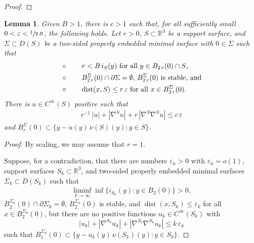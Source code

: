 \documentclass[11pt]{amsart}
\newtheorem{lem}[prop]{Lemma}
\begin{document}
\begin{appendices}
\begin{proof}
\end{proof}


\begin{lem} \label{slab lemma}
Given $B>1$, there is $c>1$ such that, for all sufficiently small $0<\varepsilon<\sfrac{1}{2\,B}$, the following holds.  Let $r>0$, $S\subset \mathbb{R}^3$ be a support surface,   
 and $\Sigma\subset D(S)$ be a two-sided properly embedded minimal surface with $0\in \Sigma$ such that
 \begin{align}
 	&\circ\qquad r<B\,i_S(y)\text{ for all $y\in B_{2\,r}(0)\cap S$,} \notag \\
 	&\circ \qquad \text{$B^\Sigma_{2\,r}(0)\cap \partial \Sigma=\emptyset,$   $B^\Sigma_{2\,r}(0)$ is stable, and}\notag \\
 	&\circ\qquad  \operatorname{dist}(x,S)\leq r\,\varepsilon \text{  for all $x\in B^\Sigma_{2\,r}(0)$.}\notag 
 \end{align}
   There is   $u\in C^\infty(S)$ positive such that 
\begin{align*} 
r^{-1}\,|u|+|\nabla^S u|+r\,|\nabla^S\nabla^Su|\leq c\,\varepsilon
\end{align*} 
and $B^\Sigma_{r}(0)\subset \{y-u(y)\,\nu(S)(y):y\in S\}$.\end{lem} 

\begin{proof}
		By scaling, we may assume that $r=1$. 
		
		Suppose, for a contradiction, that there are numbers $\varepsilon_k>0$ with $\varepsilon_k=o(1)$, support surfaces $S_k\subset \mathbb{R}^3$,  
		and  two-sided properly embedded minimal surfaces $\Sigma_k\subset D(S_k)$ such that
		\begin{align} \label{reach and curvature bound}
		\liminf_{k\to\infty} \inf\{i_{S_k}(y):y\in B_2(0)\}>0,
		\end{align}   $B^{\Sigma_k}_2(0)\cap \partial \Sigma_k=\emptyset$,  $B^{\Sigma_k}_2(0)$ is stable, and $\operatorname{dist}(x,S_k)\leq \varepsilon_k$ for all $x\in B^{\Sigma_k}_2(0)$, but there are no positive functions $u_k\in C^\infty(S_k)$ with 
		$$
		|u_k|+|\nabla^{S_k} u_k|+|\nabla^{S_k}\nabla^{S_k}u_k|\leq k\,\varepsilon_k
		$$
		such that $B^{\Sigma_k}_{1}(0)\subset \{y-u_k(y)\,\nu(S_k)(y):y\in S_k\}$.
		

\end{proof}
\end{appendices}
\end{document}

